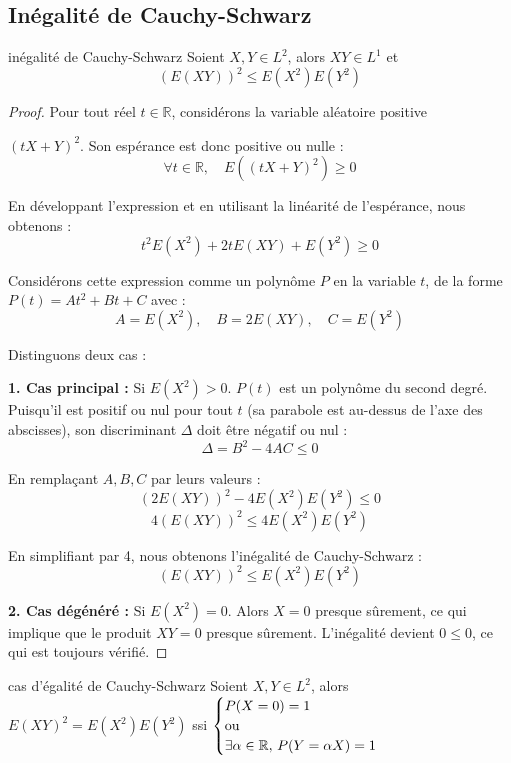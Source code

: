 \subsection{Inégalité de Cauchy-Schwarz }

\begin{theoreme}{inégalité de Cauchy-Schwarz}{}
    Soient $X, Y \in L^2$, alors $XY \in L^1$ et
    $$ (E(XY))^2 \leqslant E(X^2) E(Y^2) $$
\end{theoreme}

\begin{proof}
    Pour tout réel $t \in \mathbb{R}$, considérons la variable aléatoire positive 
    
    $(tX + Y)^2$.
    Son espérance est donc positive ou nulle :
    $$ \forall t \in \mathbb{R}, \quad E\left( (tX + Y)^2 \right) \geqslant 0 $$
    
    En développant l'expression et en utilisant la linéarité de l'espérance, nous obtenons :
    $$ t^2 E(X^2) + 2t E(XY) + E(Y^2) \geqslant 0 $$
    
    Considérons cette expression comme un polynôme $P$ en la variable $t$, de la forme $P(t) = A t^2 + Bt + C$ avec :
    $$ A = E(X^2), \quad B = 2E(XY), \quad C = E(Y^2) $$
    
    Distinguons deux cas :
    
    \textbf{1. Cas principal :} Si $E(X^2) > 0$.
    $P(t)$ est un polynôme du second degré. Puisqu'il est positif ou nul pour tout $t$ (sa parabole est au-dessus de l'axe des abscisses), son discriminant $\Delta$ doit être négatif ou nul :
    $$ \Delta = B^2 - 4AC \leqslant 0 $$
    
    En remplaçant $A, B, C$ par leurs valeurs :
    $$ (2E(XY))^2 - 4 E(X^2) E(Y^2) \leqslant 0 $$
    $$ 4 (E(XY))^2 \leqslant 4 E(X^2) E(Y^2) $$
    
    En simplifiant par 4, nous obtenons l'inégalité de Cauchy-Schwarz :
    $$ (E(XY))^2 \leqslant E(X^2) E(Y^2) $$
    
    \textbf{2. Cas dégénéré :} Si $E(X^2) = 0$.
    Alors $X = 0$ presque sûrement, ce qui implique que le produit $XY = 0$ presque sûrement. 
    L'inégalité devient $0 \leqslant 0$, ce qui est toujours vérifié.
\end{proof}

\begin{proposition}{cas d'égalité de Cauchy-Schwarz}{}
    Soient $X, Y \in L^2$, alors $E(XY)^2 = E(X^2) E(Y^2)$ ssi 
    $\begin{cases}
        P(X = 0) = 1 \\
        \text{ou} \\
        \exists \alpha \in \mathbb{R}, \, P(Y = \alpha X) = 1
    \end{cases}$
\end{proposition}

